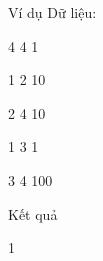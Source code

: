 Ví dụ
Dữ liệu:  

   4 4 1   


   1 2 10   


   2 4 10   


   1 3 1   


   3 4 100   




   Kết quả  

   1